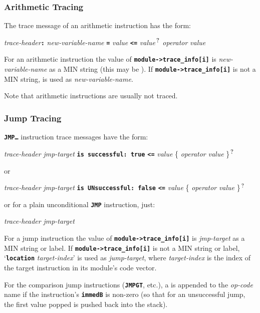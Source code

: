 \documentclass[12pt]{article}
\newcommand{\TT}[1]{{\tt \bfseries #1}}
\newcommand{\QMARK}{{$^{\,\mbox{\footnotesize ?}}$}}
\newcommand{\EOL}{\penalty \exhyphenpenalty}
\begin{document}
\subsubsection{Arithmetic Tracing}
\label{ARITHMETIC-TRACING}

The trace message of an arithmetic instruction has the form:
\begin{center}
{\em trace-header}\TT{:} {\em new-variable-name} \TT{=} {\em value}
                    \TT{<=} {\em value}\QMARK{}
                    {\em operator} {\em value}
\end{center}
For an arithmetic instruction the value of
\TT{module->\EOL trace\_\EOL info[i]} is {\em new-variable-name}
as a MIN string (this may be \TT{*}).
If \TT{module->\EOL trace\_\EOL info[i]} is not a MIN string,
\TT{*} is used as {\em new-variable-name}.

Note that arithmetic instructions are usually not traced.

\subsubsection{Jump Tracing}
\label{JUMP-TRACING}

\TT{JMP\ldots} instruction trace messages have the form:

\begin{center}
{\em trace-header} {\em jmp-target} \TT{is successful:~true}
                    \TT{<=} {\em value} \{ {\em operator} {\em value} \}\QMARK{}
\end{center}
or
\begin{center}
{\em trace-header} {\em jmp-target} \TT{is UNsuccessful:~false}
                    \TT{<=} {\em value} \{ {\em operator} {\em value} \}\QMARK{}
\end{center}

or for a plain unconditional \TT{JMP} instruction, just:
\begin{center}
{\em trace-header} {\em jmp-target}
\end{center}

For a jump instruction the value of
\TT{module->\EOL trace\_\EOL info[i]} is {\em jmp-target}
as a MIN string or label.
If \TT{module->\EOL trace\_\EOL info[i]} is not a MIN string or label,
`\TT{location} {\em target-index}' is used as {\em jump-target}, where
{\em target-index} is the index of the target instruction in its
module's code vector.

For the comparison jump instructions (\TT{JMPGT}, etc.), a \TT{*}
is appended to the {\em op-code} name if the instruction's
\TT{immedB} is non-zero (so that for an unsuccessful jump,
the first value popped is
pushed back into the stack).
\end{document}
